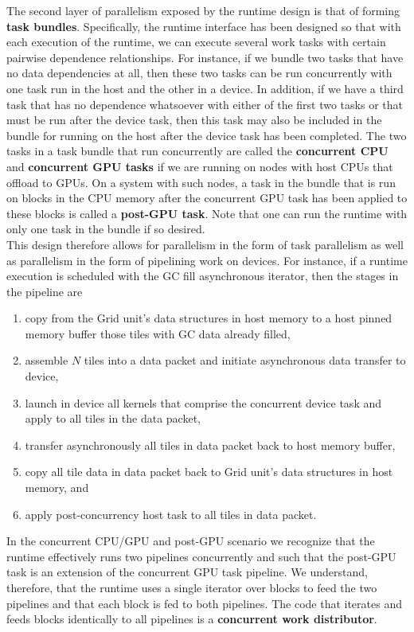 \documentclass{article}
\begin{document}
The second layer of parallelism exposed by the runtime design is that of forming
\textbf{task bundles}.  Specifically, the runtime interface has been designed so
that with each execution of the runtime, we can execute several work tasks with
certain pairwise dependence relationships.  For instance, if we bundle two tasks
that have no data dependencies at all, then these two tasks can be run
concurrently with one task run in the host and the other in a device.  In
addition, if we have a third task that has no dependence whatsoever with either
of the first two tasks or that must be run after the device task, then this
task may also be included in the bundle for running on the host after the device
task has been completed.  The two tasks in a task bundle that run concurrently
are called the \textbf{concurrent CPU} and \textbf{concurrent GPU tasks} if we are
running on nodes with host CPUs that offload to GPUs.  On a system with such nodes, a
task in the bundle that is run on blocks in the CPU memory after the concurrent
GPU task has been applied to these blocks is called a \textbf{post-GPU
task}.  Note that one can run the runtime with only one task in the bundle
if so desired.\\

This design therefore allows for parallelism in the form of task parallelism as
well as parallelism in the form of pipelining work on devices.  For instance, if a
runtime execution is scheduled with the GC fill asynchronous iterator, then the
stages in the pipeline are
\begin{enumerate}
\item{copy from the Grid unit's data structures in host memory to a host pinned memory
buffer those tiles with GC data already filled,}
\item{assemble $N$ tiles into a data packet and initiate asynchronous data
transfer to device,}
\item{launch in device all kernels that comprise the concurrent device task and
apply to all tiles in the data packet,}
\item{transfer asynchronously all tiles in data packet back to host memory
buffer,}
\item{copy all tile data in data packet back to Grid unit's data structures in
host memory, and}
\item{apply post-concurrency host task to all tiles in data packet.}
\end{enumerate}

In the concurrent CPU/GPU and post-GPU scenario we recognize that the runtime
effectively runs two pipelines concurrently and such that the post-GPU task is
an extension of the concurrent GPU task pipeline.  We understand, therefore,
that the runtime uses a single iterator over blocks to feed the two pipelines
and that each block is fed to both pipelines.  The code that iterates and feeds
blocks identically to all pipelines is a \textbf{concurrent work distributor}.\\
\end{document}
